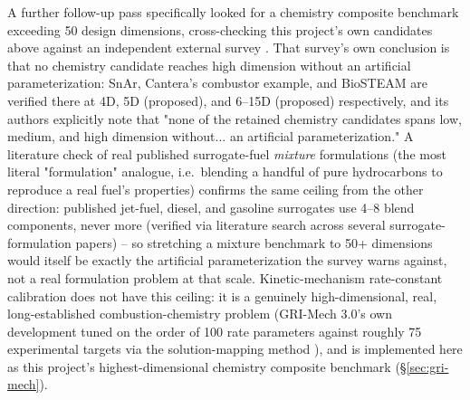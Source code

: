 \documentclass[11pt]{article}
\begin{document}
A further follow-up pass specifically looked for a chemistry composite
benchmark exceeding 50 design dimensions, cross-checking this project's
own candidates above against an independent external survey
\citep{sahas266mixturebench}. That survey's own conclusion is that no
chemistry candidate reaches high dimension without an artificial
parameterization: SnAr, Cantera's combustor example, and BioSTEAM are
verified there at 4D, 5D (proposed), and 6--15D (proposed) respectively,
and its authors explicitly note that "none of the retained chemistry
candidates spans low, medium, and high dimension without... an
artificial parameterization." A literature check of real published
surrogate-fuel \emph{mixture} formulations (the most literal
"formulation" analogue, i.e.\ blending a handful of pure hydrocarbons to
reproduce a real fuel's properties) confirms the same ceiling from the
other direction: published jet-fuel, diesel, and gasoline surrogates
use 4--8 blend components, never more (verified via literature search
across several surrogate-formulation papers) -- so stretching a mixture
benchmark to 50+ dimensions would itself be exactly the artificial
parameterization the survey warns against, not a real formulation
problem at that scale. Kinetic-mechanism rate-constant calibration
does not have this ceiling: it is a genuinely high-dimensional, real,
long-established combustion-chemistry problem (GRI-Mech 3.0's own
development tuned on the order of 100 rate parameters against roughly
75 experimental targets via the solution-mapping method
\citep{frenklach1992solutionmapping}), and is implemented here as this
project's highest-dimensional chemistry composite benchmark
(\S\ref{sec:gri-mech}).
\end{document}
